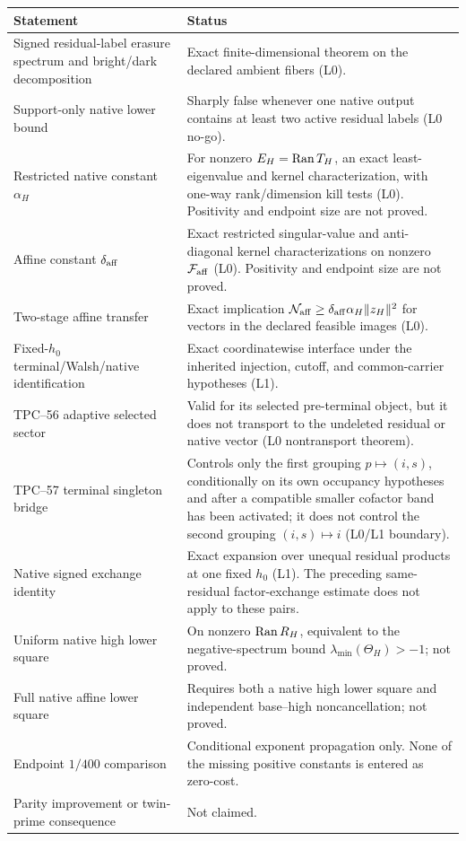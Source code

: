 \begin{center}
\small
\begin{tabular}{>{\raggedright\arraybackslash}p{}
                >{\raggedright\arraybackslash}p{}}
\toprule
Statement & Status \\
\midrule
Signed residual-label erasure spectrum and bright/dark decomposition
& Exact finite-dimensional theorem on the declared ambient fibers (L0). \\
Support-only native lower bound
& Sharply false whenever one native output contains at least two active
  residual labels (L0 no-go). \\
Restricted native constant \(\alpha_H\)
& For nonzero \(E_H=\operatorname{Ran} T_H\), an exact least-eigenvalue and kernel
  characterization, with one-way rank/dimension kill tests (L0).
  Positivity and endpoint size are not proved. \\
Affine constant \(\delta_{\rm aff}\)
& Exact restricted singular-value and anti-diagonal kernel
  characterizations on nonzero \(\mathcal F_{\rm aff}\) (L0).  Positivity and
  endpoint size are not proved. \\
Two-stage affine transfer
& Exact implication
  \(\mathcal N_{\rm aff}\ge\delta_{\rm aff}\alpha_H\|z_H\|^2\)
  for vectors in the declared feasible images (L0). \\
Fixed-\(h_0\) terminal/Walsh/native identification
& Exact coordinatewise interface under the inherited injection, cutoff, and
  common-carrier hypotheses (L1). \\
TPC--56 adaptive selected sector
& Valid for its selected pre-terminal object, but it does not transport to
  the undeleted residual or native vector (L0 nontransport theorem). \\
TPC--57 terminal singleton bridge
& Controls only the first grouping \(p\mapsto(i,s)\), conditionally on its
  own occupancy hypotheses and after a compatible smaller cofactor band has
  been activated; it does not control the second grouping
  \((i,s)\mapsto i\) (L0/L1 boundary). \\
Native signed exchange identity
& Exact expansion over unequal residual products at one fixed \(h_0\)
  (L1).  The preceding same-residual factor-exchange estimate does not apply
  to these pairs. \\
Uniform native high lower square
& On nonzero \(\operatorname{Ran} R_H\), equivalent to the negative-spectrum bound
  \(\lambda_{\min}(\Theta_H)>-1\); not proved. \\
Full native affine lower square
& Requires both a native high lower square and independent base--high
  noncancellation; not proved. \\
Endpoint \(1/400\) comparison
& Conditional exponent propagation only.  None of the missing positive
  constants is entered as zero-cost. \\
Parity improvement or twin-prime consequence
& Not claimed. \\
\bottomrule
\end{tabular}
\end{center}

